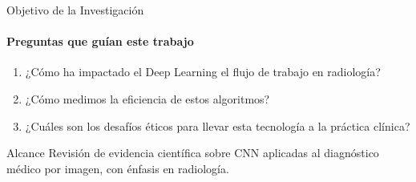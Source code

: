 \begin{frame}{Objetivo de la Investigación}
\framesubtitle{Preguntas que guían este trabajo}

\begin{enumerate}
    \item ¿Cómo ha impactado el Deep Learning el flujo de trabajo en \alert{radiología}?
    \item ¿Cómo medimos la \alert{eficiencia} de estos algoritmos?
    \item ¿Cuáles son los \alert{desafíos éticos} para llevar esta tecnología a la práctica clínica?
\end{enumerate}

\vfill

\begin{block}{\faBookOpen\; Alcance}
Revisión de evidencia científica sobre CNN aplicadas al diagnóstico médico por imagen, con énfasis en radiología.
\end{block}

\end{frame}
